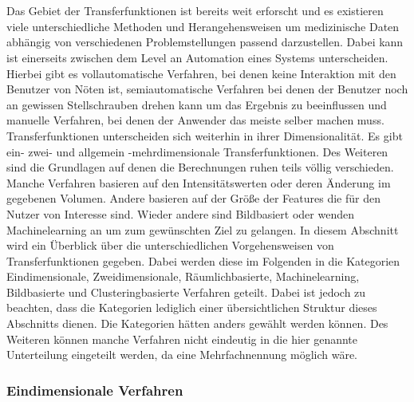 \chapter{}
\label{sec:state_of_the_art}






Das Gebiet der Transferfunktionen ist bereits weit erforscht und es existieren viele unterschiedliche Methoden und Herangehensweisen um medizinische Daten abhängig von verschiedenen Problemstellungen passend darzustellen.
\newline
Dabei kann ist einerseits zwischen dem Level an Automation eines Systems unterscheiden. Hierbei gibt es vollautomatische Verfahren, bei denen keine Interaktion mit den Benutzer von Nöten ist, semiautomatische Verfahren bei denen der Benutzer noch an gewissen Stellschrauben drehen kann um das Ergebnis zu beeinflussen und manuelle Verfahren, bei denen der Anwender das meiste selber machen muss.
\newline
Transferfunktionen unterscheiden sich weiterhin in ihrer Dimensionalität. Es gibt ein- zwei- und allgemein -mehrdimensionale Transferfunktionen. Des Weiteren sind die Grundlagen auf denen die Berechnungen ruhen teils völlig verschieden. Manche Verfahren basieren auf den Intensitätswerten oder deren Änderung im gegebenen Volumen. Andere basieren auf der Größe der Features die für den Nutzer von Interesse sind. Wieder andere sind Bildbasiert oder wenden Machinelearning an um zum gewünschten Ziel zu gelangen.
\newline
In diesem Abschnitt wird ein Überblick über die unterschiedlichen Vorgehensweisen von Transferfunktionen gegeben. Dabei werden diese im Folgenden in die Kategorien Eindimensionale, Zweidimensionale, Räumlichbasierte, Machinelearning, Bildbasierte und Clusteringbasierte Verfahren geteilt.
\newline
Dabei ist jedoch zu beachten, dass die Kategorien lediglich einer übersichtlichen Struktur dieses Abschnitts dienen. Die Kategorien hätten anders gewählt werden können. Des Weiteren können manche Verfahren nicht eindeutig in die hier genannte Unterteilung eingeteilt werden, da eine Mehrfachnennung möglich wäre.


\subsection{Eindimensionale Verfahren}

